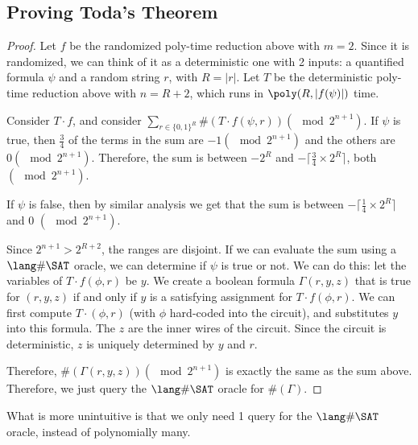 \subsection*{Proving Toda's Theorem}
\begin{proof}
Let $f$ be the randomized poly-time reduction above with $m=2$. Since it is randomized, we can think of it as a deterministic one with 2 inputs: a quantified formula $\psi$ and a random string $r$, with $R = |r|$. Let $T$ be the deterministic poly-time reduction above with $n = R+2$, which runs in $\poly(R, |f(\psi)|)$ time. 

\par Consider $T \cdot f$, and consider $\sum_{r \in \{0, 1\}^R} \#(T \cdot f(\psi, r)) (\mod 2^{n+1})$. If $\psi$ is true, then $\frac{3}{4}$ of the terms in the sum are $-1 (\mod 2^{n+1})$ and the others are $0 (\mod 2^{n+1})$. Therefore, the sum is between $-2^R$ and $-\lceil \frac{3}{4} \times 2^R \rceil$, both $(\mod 2^{n+1})$.

\par If $\psi$ is false, then by similar analysis we get that the sum is between $-\lceil \frac{1}{4} \times 2^R\rceil$ and 0 $(\mod 2^{n+1})$. 

\par Since $2^{n+1} > 2^{R+2}$, the ranges are disjoint. If we can evaluate the sum using a $\SharpSAT$ oracle, we can determine if $\psi$ is true or not. We can do this: let the variables of $T \cdot f(\phi, r)$ be $y$. We create a boolean formula $\Gamma(r, y, z)$ that is true for $(r, y, z)$ if and only if $y$ is a satisfying assignment for $T \cdot f(\phi, r)$. We can first compute $T \cdot(\phi, r)$ (with $\phi$ hard-coded into the circuit), and substitutes $y$ into this formula. The $z$ are the inner wires of the circuit. Since the circuit is deterministic, $z$ is uniquely determined by $y$ and $r$. 

\par Therefore, $\#(\Gamma(r,y,z)) (\mod 2^{n+1})$ is exactly the same as the sum above. Therefore, we just query the $\SharpSAT$ oracle for $\#(\Gamma)$.
\end{proof}
What is more unintuitive is that we only need 1 query for the $\SharpSAT$ oracle, instead of polynomially many. 